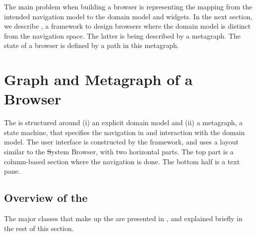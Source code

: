 \documentclass[a4paper,10pt,twoside]{book}
\begin{document}
 The main problem when building a browser is representing the mapping from the intended navigation model to the domain model and widgets. 
In the next section, we describe \ob, a framework to design browsers where the domain model is distinct from the navigation space. The latter is being described by a metagraph. The state of a browser is defined by a path in this metagraph.

\section{Graph and Metagraph of a Browser} \label{sec:omnibrowser}


The \obf is structured around (i) an explicit domain model and (ii) a metagraph, a state machine, that specifies the navigation in and interaction with the domain model. The user interface is constructed by the framework, and uses a layout similar to the \st System Browser, with two horizontal parts. The top part is a column-based section where the navigation is done. The bottom half is a text pane.


\subsection{Overview of the \obf}\label{sec:overview}
The major classes that make up the \obf are presented in , and explained briefly in the rest of this section. %
\end{document}
